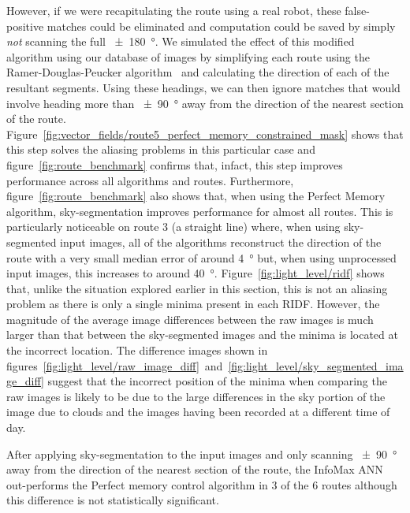 \documentclass[letterpaper]{article}
\begin{document}
However, if we were recapitulating the route using a real robot, these false-positive matches could be eliminated and computation could be saved by simply \emph{not} scanning the full \SI{\pm 180}{\degree}. 
We simulated the effect of this modified algorithm using our database of images by simplifying each route using the Ramer-Douglas-Peucker algorithm~\citep{Ramer1972} and calculating the direction of each of the resultant segments.
Using these headings, we can then ignore matches that would involve heading more than \SI{\pm 90}{\degree} away from the direction of the nearest section of the route.
Figure~\ref{fig:vector_fields/route5_perfect_memory_constrained_mask} shows that this step solves the aliasing problems in this particular case and figure~\ref{fig:route_benchmark} confirms that, infact, this step improves performance across all algorithms and routes.
Furthermore, figure~\ref{fig:route_benchmark} also shows that, when using the Perfect Memory algorithm, sky-segmentation improves performance for almost all routes.
This is particularly noticeable on route 3 (a straight line) where, when using sky-segmented input images, all of the algorithms reconstruct the direction of the route with a very small median error of around \SI{4}{\degree} but, when using unprocessed input images, this increases to around \SI{40}{\degree}.
Figure~\ref{fig:light_level/ridf} shows that, unlike the situation explored earlier in this section, this is not an aliasing problem as there is only a single minima present in each RIDF.
However, the magnitude of the average image differences between the raw images is much larger than that between the sky-segmented images and the minima is located at the incorrect location.
The difference images shown in figures~\ref{fig:light_level/raw_image_diff}~and~\ref{fig:light_level/sky_segmented_image_diff} suggest that the incorrect position of the minima when comparing the raw images is likely to be due to the large differences in the sky portion of the image due to clouds and the images having been recorded at a different time of day.

After applying sky-segmentation to the input images and only scanning \SI{\pm 90}{\degree} away from the direction of the nearest section of the route, the InfoMax ANN out-performs the Perfect memory control algorithm in 3 of the 6 routes although this difference is not statistically significant.
\end{document}
